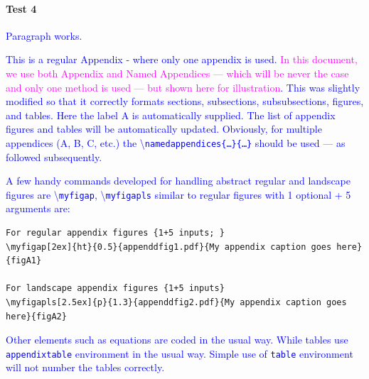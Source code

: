 \documentclass[phd,showgrids]{ndsu-thesis-2022}
\newcommand\italk[1]{\textcolor{blue}{#1}}  %
\newcommand\cmd[1]{\textbackslash\texttt{#1}}  %
\begin{document}
\paragraph{Test 4}
\italk{Paragraph works.} 


\renewcommand{\bibname}{REFERENCES}

\makerefs %

\label{biblio}


\appendix %

\italk{This is a regular Appendix - where only one appendix is used. \textcolor{magenta}{In this document, we use both Appendix and Named Appendices --- which will be never the case and only one method is used --- but shown here for illustration}. This was slightly modified so that it correctly formats sections, subsections, subsubsections, figures, and tables. Here the label A is automatically supplied. The list of appendix figures and tables will be automatically updated. Obviously, for multiple appendices (A, B, C, etc.) the \cmd{namedappendices\{\ldots\}\{\ldots\}} should be used --- as followed subsequently.}

\italk{A few handy commands developed for handling abstract regular and landscape figures are \cmd{myfigap}, \cmd{myfigapls} similar to regular figures with 1 optional + 5 arguments are: } 

\label{figv}
\vspace{2ex}
{\singlespacing
\begin{verbatim}
For regular appendix figures {1+5 inputs; }
\myfigap[2ex]{ht}{0.5}{appenddfig1.pdf}{My appendix caption goes here}{figA1}

For landscape appendix figures {1+5 inputs}
\myfigapls[2.5ex]{p}{1.3}{appenddfig2.pdf}{My appendix caption goes here}{figA2}
\end{verbatim}
}

\italk{Other elements such as equations are coded in the usual way. While tables use \texttt{appendixtable} environment in the usual way. Simple use of \texttt{table} environment will not number the tables correctly.}
\end{document}
